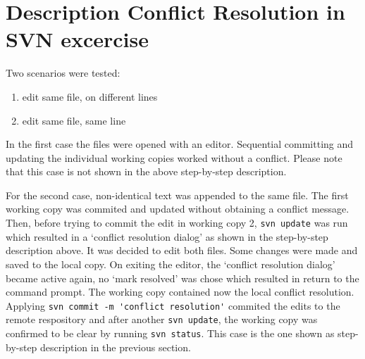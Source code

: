\documentclass[a4paper,11pt,twoside]{article}
\begin{document}
\section{Description Conflict Resolution in SVN excercise}
Two scenarios were tested:
\begin{enumerate}
\item edit same file, on different lines
\item edit same file, same line
\end{enumerate}

In the first case the files were opened with an editor. Sequential committing and updating the individual working copies worked without a conflict. Please note that this case is not shown in the above step-by-step description.

For the second case, non-identical text was appended to the same file. The first working copy was commited and updated without obtaining a conflict message. Then, before trying to commit the edit in working copy 2, \verb!svn update! was run which resulted in a `conflict resolution dialog' as shown in the step-by-step description above. It was decided to edit both files. Some changes were made and saved to the local copy. On exiting the editor, the `conflict resolution dialog' became active again, no `mark resolved' was chose which resulted in return to the command prompt. The working copy contained now the local conflict resolution. Applying \verb!svn commit -m 'conflict resolution'! commited the edits to the remote respository and after another \verb!svn update!, the working copy was confirmed to be clear by running \verb!svn status!. This case is the one shown as step-by-step description in the previous section.


%
\end{document}
